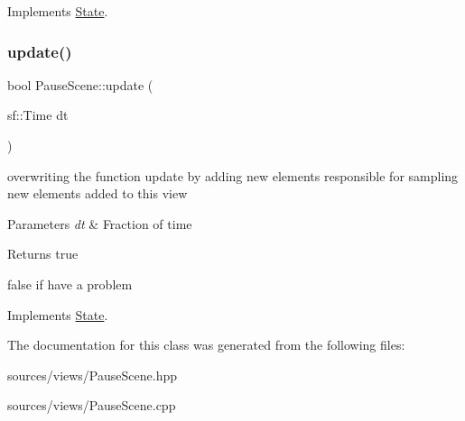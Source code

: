 Implements \hyperlink{classState_a19965f83460b248c42952aac8d001206}{State}.

\mbox{\label{classPauseScene_ab1d5af95abe16f5d7a0cd98b9d1e1c96}} 
\subsubsection{\texorpdfstring{update()}{update()}}
{\footnotesize\ttfamily bool Pause\+Scene\+::update (\begin{DoxyParamCaption}\item[{sf\+::\+Time}]{dt }\end{DoxyParamCaption})\hspace{0.3cm}{\ttfamily [virtual]}}



overwriting the function update by adding new elements responsible for sampling new elements added to this view 


\begin{DoxyParams}{Parameters}
{\em dt} & Fraction of time \\
\hline
\end{DoxyParams}
\begin{DoxyReturn}{Returns}
true 

false if have a problem 
\end{DoxyReturn}


Implements \hyperlink{classState_acd5926bc7a373edff9e57f3ffe94ca13}{State}.



The documentation for this class was generated from the following files\+:\begin{DoxyCompactItemize}
\item 
sources/views/Pause\+Scene.\+hpp\item 
sources/views/Pause\+Scene.\+cpp\end{DoxyCompactItemize}
